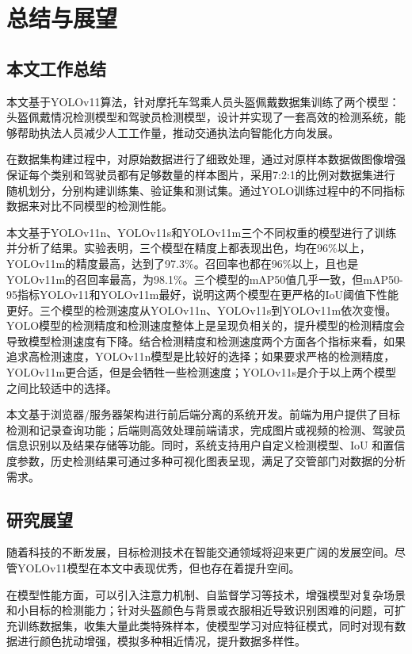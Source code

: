 
\chapter{总结与展望}

\section{本文工作总结}
本文基于YOLOv11算法，针对摩托车驾乘人员头盔佩戴数据集训练了两个模型：头盔佩戴情况检测模型和驾驶员检测模型，设计并实现了一套高效的检测系统，能够帮助执法人员减少人工工作量，推动交通执法向智能化方向发展。

在数据集构建过程中，对原始数据进行了细致处理，通过对原样本数据做图像增强保证每个类别和驾驶员都有足够数量的样本图片，采用7:2:1的比例对数据集进行随机划分，分别构建训练集、验证集和测试集。通过YOLO训练过程中的不同指标数据来对比不同模型的检测性能。

本文基于YOLOv11n、YOLOv11s和YOLOv11m三个不同权重的模型进行了训练并分析了结果。实验表明，三个模型在精度上都表现出色，均在96\%以上，YOLOv11m的精度最高，达到了97.3\%。召回率也都在96\%以上，且也是YOLOv11m的召回率最高，为98.1\%。三个模型的mAP50值几乎一致，但mAP50-95指标YOLOv11和YOLOv11m最好，说明这两个模型在更严格的IoU阈值下性能更好。三个模型的检测速度从YOLOv11n、YOLOv11s到YOLOv11m依次变慢。YOLO模型的检测精度和检测速度整体上是呈现负相关的，提升模型的检测精度会导致模型检测速度有下降。结合检测精度和检测速度两个方面各个指标来看，如果追求高检测速度，YOLOv11n模型是比较好的选择；如果要求严格的检测精度，YOLOv11m更合适，但是会牺牲一些检测速度；YOLOv11s是介于以上两个模型之间比较适中的选择。

本文基于浏览器/服务器架构进行前后端分离的系统开发。前端为用户提供了目标检测和记录查询功能；后端则高效处理前端请求，完成图片或视频的检测、驾驶员信息识别以及结果存储等功能。同时，系统支持用户自定义检测模型、IoU 和置信度参数，历史检测结果可通过多种可视化图表呈现，满足了交管部门对数据的分析需求。

\section{研究展望}
随着科技的不断发展，目标检测技术在智能交通领域将迎来更广阔的发展空间。尽管YOLOv11模型在本文中表现优秀，但也存在着提升空间。

在模型性能方面，可以引入注意力机制、自监督学习等技术，增强模型对复杂场景和小目标的检测能力；针对头盔颜色与背景或衣服相近导致识别困难的问题，可扩充训练数据集，收集大量此类特殊样本，使模型学习对应特征模式，同时对现有数据进行颜色扰动增强，模拟多种相近情况，提升数据多样性。


